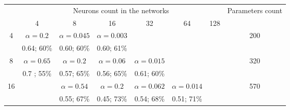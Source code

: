 \documentclass[14pt,border=10pt]{standalone}
\begin{document}
\begin{tabular}{c|cccccc|c}
	                     & \multicolumn{6}{c}{Neurons count in the networks} & Parameters count                                                                                                                                                                                          \\
	                     & 4                                                 & 8                                 & 16                                & 32                                & 64                                & 128                               &                       \\ \hline
	\multirow{2}{*}{4}   & \cellcolor{blue!25}$\alpha = 0.2$                 & $\alpha = 0.045$                  & $\alpha = 0.003$                  &                                   &                                   &                                   & \multirow{2}{*}{200}  \\
	                     & \cellcolor{blue!25}0.64; 60\%                     & 0.60; 60\%                        & 0.60; 61\%                        &                                   &                                   &                                   &                       \\ \hline
	\multirow{2}{*}{8}   & $\alpha = 0.65$                                   & \cellcolor{blue!25}$\alpha = 0.2$ & $\alpha = 0.06$                   & $\alpha = 0.015$                  &                                   &                                   & \multirow{2}{*}{320}  \\
	                     & 0.7 ; 55\%                                        & \cellcolor{blue!25}0.57; 65\%     & 0.56; 65\%                        & 0.61; 60\%                        &                                   &                                   &                       \\ \hline
	\multirow{2}{*}{16}  &                                                   & $\alpha = 0.54$                   & \cellcolor{blue!25}$\alpha = 0.2$ & $\alpha = 0.062$                  & $\alpha = 0.014$                  &                                   & \multirow{2}{*}{570}  \\
	                     &                                                   & 0.55; 67\%                        & \cellcolor{blue!25}0.45; 73\%     & 0.54; 68\%                        & 0.51; 71\%                        &                                   &                       \\ \hline

\end{tabular}
\end{document}
